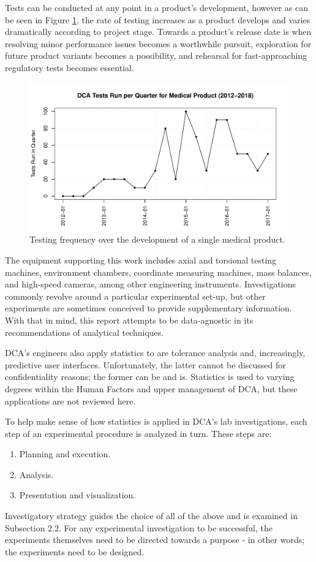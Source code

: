 \documentclass[11pt,a4paper,article]{memoir} %
\begin{document}
Tests can be conducted at any point in a product's development, however as can be seen in Figure \ref{fig:tests_per_quarter}, the rate of testing increases as a product develops and varies dramatically according to project stage. Towards a product's release date is when resolving minor performance issues becomes a worthwhile pursuit, exploration for future product variants becomes a possibility, and rehearsal for fast-approaching regulatory tests becomes essential.
\begin{figure}
\includegraphics[width=\textwidth]{tests_per_quarter.pdf}
\caption{Testing frequency over the development of a single medical product.}
\label{fig:tests_per_quarter}
\end{figure}
\par
The equipment supporting this work includes axial and torsional testing machines, environment chambers, coordinate measuring machines, mass balances, and high-speed cameras, among other engineering instruments. Investigations commonly revolve around a particular experimental set-up, but other experiments are sometimes conceived to provide supplementary information. With that in mind, this report attempts to be data-agnostic in its recommendations of analytical techniques.
\par
DCA's engineers also apply statistics to are tolerance analysis and, increasingly, predictive user interfaces. Unfortunately, the latter cannot be discussed for confidentiality reasons; the former can be and is. Statistics is used to varying degrees within the Human Factors and upper management of DCA, but these applications are not reviewed here.
\par
To help make sense of how statistics is applied in DCA's lab investigations, each step of an experimental procedure is analyzed in turn. These steps are:
\begin{enumerate}
\item Planning and execution.
\item Analysis.
\item Presentation and visualization.
\end{enumerate}
Investigatory strategy guides the choice of all of the above and is examined in Subsection 2.2. For any experimental investigation to be successful, the experiments themselves need to be directed towards a purpose - in other words; the experiments need to be designed.
\end{document}
